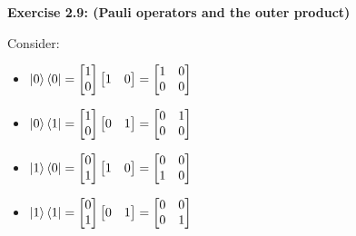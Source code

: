 \documentclass{article}
\begin{document}
\bigskip

\begin{framed}
    \noindent \textbf{Exercise 2.9: (Pauli operators and the outer product)}
    
    \medskip

    Consider:
    \begin{itemize}
        \item $\ket{0}\bra{0} = \begin{bmatrix}1 \\ 0\end{bmatrix}\begin{bmatrix}1 & 0\end{bmatrix} = \begin{bmatrix}1 & 0\\ 0 & 0\end{bmatrix}$
        \item $\ket{0}\bra{1} = \begin{bmatrix}1 \\ 0\end{bmatrix}\begin{bmatrix}0 & 1\end{bmatrix} = \begin{bmatrix}0 & 1\\ 0 & 0\end{bmatrix}$
        \item $\ket{1}\bra{0} = \begin{bmatrix}0 \\ 1\end{bmatrix}\begin{bmatrix}1 & 0\end{bmatrix} = \begin{bmatrix}0 & 0\\ 1 & 0\end{bmatrix}$
        \item $\ket{1}\bra{1} = \begin{bmatrix}0 \\ 1\end{bmatrix}\begin{bmatrix}0 & 1\end{bmatrix} = \begin{bmatrix}0 & 0\\ 0 & 1\end{bmatrix}$
    \end{itemize}
    \begin{itemize}

\end{itemize}
\end{framed}
\end{document}
